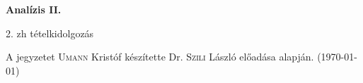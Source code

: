 \documentclass[a4paper,11.5pt]{article}
\begin{document}
	\setlength\parindent{0pt}
	\def\s{\hspace{0.2mm}\vphantom{\beta}}
	\def\Z{\mathbb{Z}}
	\def\Q{\mathbb{Q}}
	\def\R{\mathbb{R}}
	\def\C{\mathbb{C}}
	\def\N{\mathbb{N}}
	\def\Ra{\overline{\mathbb{R}}}
	
	\def\sume{\displaystyle\sum_{n=1}^{+\infty}}
	\def\sumn{\displaystyle\sum_{n=0}^{+\infty}}
	
	\def\narrow{\underset{n\rightarrow+\infty}{\longrightarrow}}
	\def\limn{\displaystyle\lim_{n\to +\infty}}
	\def\limx{\displaystyle\lim_{x\to +\infty}}
	
	\pagestyle{plain}
	\theoremstyle{definition}
	\newtheorem{theorem}{Tétel}[subsection] 
	
	\theoremstyle{definition}
	\newtheorem{definition}[theorem]{Definíció} 
	\newtheorem{example}[theorem]{Példa} 
	\newtheorem{task}[theorem]{Feladat} 
	\newtheorem{note}[theorem]{Megjegyzés}
	\newtheorem{revision}[theorem]{Emlékeztető}
	\begin{center}
		{\LARGE\textbf{Analízis II.}}
		\smallskip
		
		{\Large 2. zh tételkidolgozás}
	\end{center}
	A jegyzetet \textsc{Umann} Kristóf készítette Dr. \textsc{Szili} László  előadása alapján. (\today)
\end{document}
